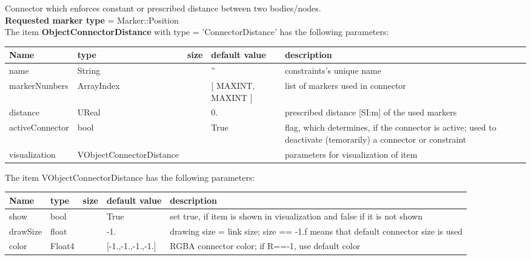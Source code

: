 Connector which enforces constant or prescribed distance between two bodies/nodes.
 \\  {\bf Requested marker type} = Marker::Position \\ 
\vspace{12pt} \noindent The item {\bf ObjectConnectorDistance} with type = 'ConnectorDistance' has the following parameters:\vspace{-1cm}\\ 
\begin{center}
  \footnotesize
  \begin{longtable}{| p{4.5cm} | p{2.5cm} | p{0.5cm} | p{2.5cm} | p{6cm} |}
    \hline
    \bf Name & \bf type & \bf size & \bf default value & \bf description \\ \hline
    name &     String &      &     '' &     constraints's unique name\\ \hline
    markerNumbers &     ArrayIndex &      &     [ MAXINT, MAXINT ] &     list of markers used in connector\\ \hline
    distance &     UReal &      &     0. &     prescribed distance [SI:m] of the used markers\\ \hline
    activeConnector &     bool &      &     True &     flag, which determines, if the connector is active; used to deactivate (temorarily) a connector or constraint\\ \hline
    visualization & VObjectConnectorDistance & & & parameters for visualization of item \\ \hline
	  \end{longtable}
	\end{center}
The item VObjectConnectorDistance has the following parameters:\vspace{-1cm}\\ 
\begin{center}
  \footnotesize
  \begin{longtable}{| p{4.5cm} | p{2.5cm} | p{0.5cm} | p{2.5cm} | p{6cm} |}
    \hline
    \bf Name & \bf type & \bf size & \bf default value & \bf description \\ \hline
    show &     bool &      &     True &     set true, if item is shown in visualization and false if it is not shown\\ \hline
    drawSize &     float &      &     -1. &     drawing size = link size; size == -1.f means that default connector size is used\\ \hline
    color &     Float4 &      &     [-1.,-1.,-1.,-1.] &     RGBA connector color; if R==-1, use default color\\ \hline
	  \end{longtable}
	\end{center}

